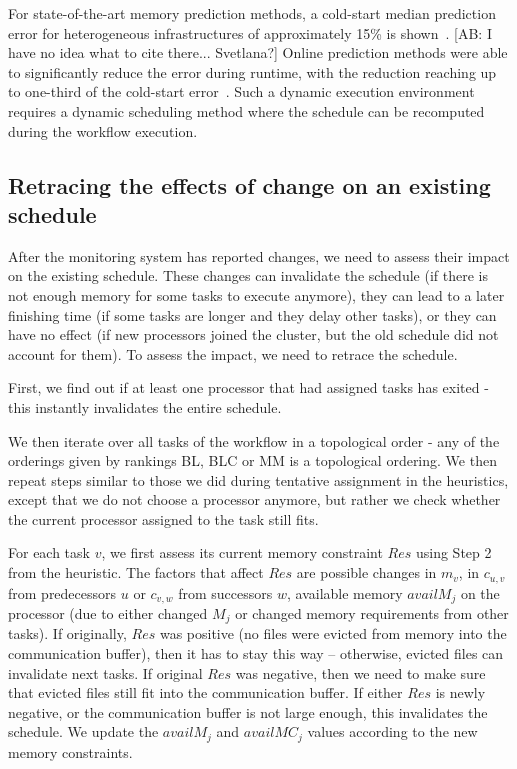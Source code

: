 \documentclass[conference]{IEEEtran}
\newcommand{\AB}[1]{{\color{purple}[AB: #1]}}
\begin{document}
    For state-of-the-art memory prediction methods, a cold-start median prediction error for heterogeneous infrastructures of approximately 15\% is shown~\cite{TODO}.
    \AB{I have no idea what to cite there... Svetlana?}
    Online prediction methods were able to significantly reduce the error during runtime, with the reduction reaching up to one-third of the cold-start error~\cite{baderDiedrichDynamic2023,witt2019learning}.
    Such a dynamic execution environment requires a dynamic scheduling method where the schedule can be recomputed during the workflow execution.

    \subsection*{Retracing the effects of change on an existing schedule}
    After the monitoring system has reported changes, we need to assess their impact on the existing schedule.
    These changes can invalidate the schedule (\eg if there is not enough memory for some tasks to execute anymore),
    they can lead to a later finishing time (\eg if some tasks are longer and they delay other tasks), or they can have no effect (\eg if new processors
    joined the cluster, but the old schedule did not account for them).
    To assess the impact, we need to retrace the schedule.

    First, we find out if at least one processor that had assigned tasks has exited - this instantly invalidates the
    entire schedule.

    We then iterate over all tasks of the workflow in a topological order - any of the orderings given by rankings BL, BLC or MM
    is a topological ordering.
    We then repeat steps similar to those we did during tentative assignment in the heuristics, 
    except that we do not choose a processor
    anymore, but rather we check whether the current processor assigned to the task still fits.

    For each task $v$, we first assess its current memory constraint $Res$ using Step 2 from the heuristic.
    The factors that affect $Res$ are possible changes in $m_v$, in $c_{u,v}$ from predecessors $u$ 
    or $c_{v,w}$ from successors $w$,
    available memory $availM_j$ on the processor (due to either changed $M_j$ or changed memory requirements 
    from other tasks).
    If originally, $Res$ was positive (no files were evicted from memory into the communication buffer), 
    then it has to stay this way --
    otherwise, evicted files can invalidate next tasks.
    If original $Res$ was negative, then we need to make sure that evicted files still fit into the communication buffer.
    If either $Res$ is newly negative, or the communication buffer is not large enough, this invalidates the schedule.
    We update the $availM_j$ and $availMC_j$ values according to the new memory constraints.
\end{document}
